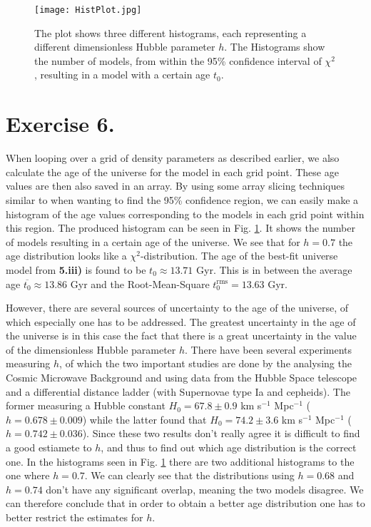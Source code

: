 \documentclass{emulateapj}
\begin{document}
	\begin{figure}
		\texttt{[image: HistPlot.jpg]}
		\caption{The plot shows three different histograms, each representing a different dimensionless Hubble parameter $h$. The Histograms show the number of models, from within the 95\% confidence interval of $\chi^2$, resulting in a model with a certain age $t_0$.}
		\label{fig:Hist}
	\end{figure}

	\section*{Exercise 6.}
	When looping over a grid of density parameters as described earlier, we also calculate the age of the universe for the model in each grid point. These age values are then also saved in an array. By using some array slicing techniques similar to when wanting to find the 95\% confidence region, we can easily make a histogram of the age values corresponding to the models in each grid point within this region. The produced histogram can be seen in Fig. \ref{fig:Hist}. It shows the number of models resulting in a certain age of the universe. We see that for $h=0.7$ the age distribution looks like a $\chi^2$-distribution. The age of the best-fit universe model from \textbf{5.iii)} is found to be $t_0\approx13.71$ Gyr. This is in between the average age $\overline{t_0} \approx 13.86$ Gyr and the Root-Mean-Square $t_0^\text{rms} = 13.63$ Gyr.
	
	However, there are several sources of uncertainty to the age of the universe, of which especially one has to be addressed. The greatest uncertainty in the age of the universe is in this case the fact that there is a great uncertainty in the value of the dimensionless Hubble parameter $h$. There have been several experiments measuring $h$, of which the two important studies are done by the \cite{planck:2016} analysing the Cosmic Microwave Background and \cite{Riess:2009} using data from the Hubble Space telescope and a differential distance ladder (with Supernovae type Ia and cepheids). The former measuring a Hubble constant $H_0 = 67.8 \pm 0.9$ km s$^{-1}$ Mpc$^{-1}$ ($h = 0.678\pm0.009$) while the latter found that $H_0 = 74.2 \pm 3.6$ km s$^{-1}$ Mpc$^{-1}$ ($h = 0.742\pm0.036$). Since these two results don't really agree it is difficult to find a good estiamete to $h$, and thus to find out which age distribution is the correct one. In the histograms seen in Fig. \ref{fig:Hist} there are two additional histograms to the one where $h=0.7$. We can clearly see that the distributions using $h=0.68$ and $h=0.74$ don't have any significant overlap, meaning the two models disagree. We can therefore conclude that in order to obtain a better age distribution one has to better restrict the estimates for $h$.
	
\end{document}
